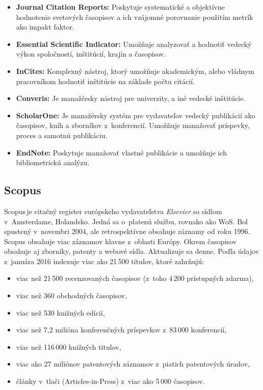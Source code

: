 \begin{itemize}
\item \textbf{Journal Citation Reports:} Poskytuje systematické a objektívne
  hodnotenie svetových časopisov a ich vzájomné porovnanie použitím metrík ako
  impakt faktor.
\item \textbf{Essential Scientific Indicator:} Umožňuje analyzovať a hodnotiť
  vedecký výkon spoločností, inštitúcií, krajín a časopisov.
\item \textbf{InCites:} Komplexný nástroj, ktorý umožňuje akademickým, alebo
  vládnym pracovníkom hodnotiť inštitúcie na základe počtu citácií.
\item \textbf{Converis:} Je manažérsky nástroj pre univerzity, a iné vedecké
  inštitúcie.
\item \textbf{ScholarOne:} Je manažérsky systém pre vydavateľov vedecký
  publikácií ako časopisov, kníh a zborníkov z~konferencií.  Umožňuje manažovať
  príspevky,  proces a samotnú publikáciu.
\item \textbf{EndNote:} Poskytuje manažovať vlastné publikácie a umožňuje ich
  bibliometrickú analýzu.
\end{itemize}



\subsection{Scopus}
\label{sec:scopus}

Scopus\,\R je citačný register európskeho vydavateľstva \emph{Elsevier} so
sídlom v~Amsterdame, Holandsko.  Jedná sa o~platenú službu, rovnako ako WoS.
Bol spustený v~novembri 2004, ale retrospektívne obsahuje záznamy od roku 1996.
Scopus obsahuje viac záznamov hlavne z~oblasti Európy.  Okrem časopisov obsahuje
aj zborníky, patenty a webové sídla.  Aktualizuje sa denne.  Podľa údajov
z~januára 2016 indexuje viac ako 21\,500 titulov, ktoré zahrňujú:

\begin{itemize}
\item viac než 21\,500 recenzovaných časopisov (z~toho 4\,200 prístupných
  zdarma),
\item viac než 360 obchodných časopisov,
\item viac než 530 knižných edícií,
\item viac než 7,2 milióna konferenčných príspevkov z~83\,000 konferencií,
\item viac než 116\,000 knižných titulov,
\item viac ako 27 miliónov patentových záznamov z~piatich patentových úradov,
\item články v~tlači (Articles-in-Press) z~viac ako 5\,000 časopisov.
\end{itemize}

